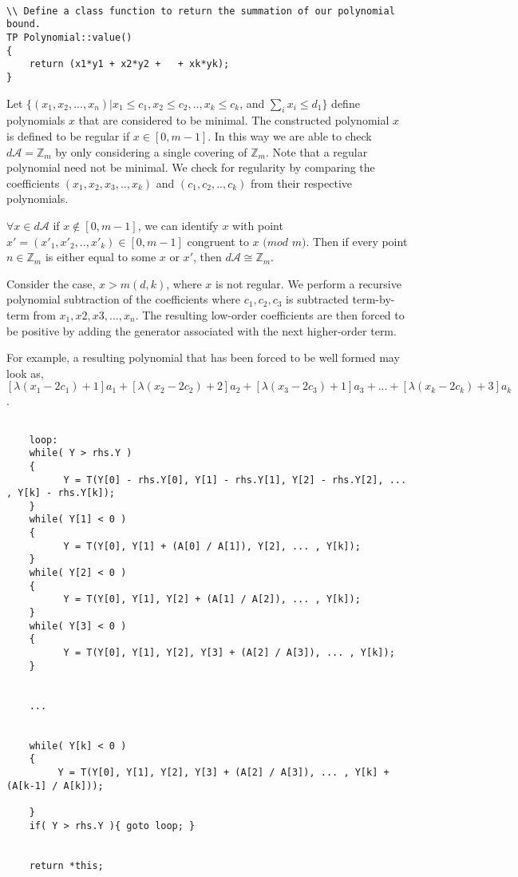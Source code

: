 \begin{lstlisting}

\\ Define a class function to return the summation of our polynomial bound.
TP Polynomial::value()
{
    return (x1*y1 + x2*y2 +   + xk*yk);
}

\end{lstlisting}

\noindent
Let $ \{ (x_{1}, x_{2}, ... , x_{n}) \vert x_{1} \leq c_{1}, x_{2} \leq c_{2}, .. , x_{k} \leq c_{k}$, and $\sum_{i} x_{i} \leq d_{1} \}$ define polynomials $x$ that are considered to be minimal.\n
The constructed polynomial $x$ is defined to be regular if $x \in [0, m-1]$. In this way we are able to check $d \mathcal{A} = \mathbb{Z}_{m}$ by only considering a single covering of $\mathbb{Z}_{m}$.\n
Note that a regular polynomial need not be minimal.\n
We check for regularity by comparing the coefficients $(x_{1}, x_{2}, x_{3}, .. , x_{k})$ and $(c_{1}, c_{2}, .. , c_{k})$ from their respective polynomials.\n

\noindent
$\forall x \in d \mathcal{A}$ if $x \notin [0, m-1]$, we can identify $x$ with point $x' = (x'_{1}, x'_{2}, .. , x'_{k}) \in [0, m-1]$ congruent to $x$ $(mod$ $m)$.  Then if every point $n \in \mathbb{Z}_{m}$ is either equal to some $x$ or $x'$, then $d \mathcal{A} \cong \mathbb{Z}_m$.\n

Consider the case, $x > m(d, k)$, where $x$ is not regular. We perform a recursive polynomial subtraction of the coefficients where $c_{1}, c_{2}, c_{3}$ is subtracted term-by-term from $x_{1}, x{2}, x{3}, ... , x_{n}$. The resulting low-order coefficients are then forced to be positive by adding the generator associated with the next higher-order term.\n

For example, a resulting polynomial that has been forced to be well formed may look as, $[\lambda(x_{1} - 2 c_{1}) + 1]a_{1} + [\lambda(x_{2} - 2 c_{2}) + 2]a_{2} + [\lambda(x_{3} - 2 c_{3}) + 1]a_{3} + ... + [\lambda(x_{k} - 2 c_{k}) + 3]a_{k}$.\n

\begin{lstlisting}

    loop:
    while( Y > rhs.Y )
    {
          Y = T(Y[0] - rhs.Y[0], Y[1] - rhs.Y[1], Y[2] - rhs.Y[2], ... , Y[k] - rhs.Y[k]);
    }
    while( Y[1] < 0 )
    {
          Y = T(Y[0], Y[1] + (A[0] / A[1]), Y[2], ... , Y[k]);
    }
    while( Y[2] < 0 )
    {
          Y = T(Y[0], Y[1], Y[2] + (A[1] / A[2]), ... , Y[k]);
    }
    while( Y[3] < 0 )
    {
          Y = T(Y[0], Y[1], Y[2], Y[3] + (A[2] / A[3]), ... , Y[k]);
    }


    ...


    while( Y[k] < 0 )
    {
         Y = T(Y[0], Y[1], Y[2], Y[3] + (A[2] / A[3]), ... , Y[k] + (A[k-1] / A[k]));

    }
    if( Y > rhs.Y ){ goto loop; } 


    return *this;

\end{lstlisting}


